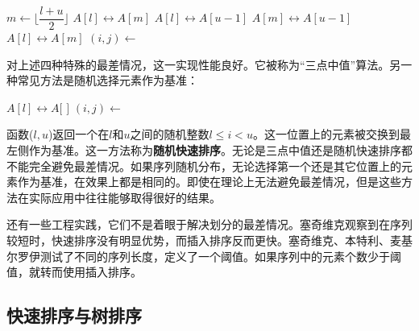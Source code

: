 \documentclass[b5paper]{ctexart}
\begin{document}
\begin{algorithmic}[1]
    \State $m \gets \lfloor \dfrac{l + u}{2} \rfloor$ 
     
      \State {} $A[l] \leftrightarrow A[m]$
    \EndIf
     
      \State {} $A[l] \leftrightarrow A[u-1]$
    \EndIf
     
      \State {} $A[m] \leftrightarrow A[u-1]$
    \EndIf
    \State {} $A[l] \leftrightarrow A[m]$
    \State $(i, j) \gets $ 
    \State {}
    \State {}
  \EndIf
\EndProcedure
\end{algorithmic}

对上述四种特殊的最差情况，这一实现性能良好。它被称为“三点中值”算法。另一种常见方法是随机选择元素作为基准：

\begin{algorithmic}[1]
    \State {} $A[l] \leftrightarrow A[$  $]$
    \State $(i, j) \gets $ 
    \State {}
    \State {}
  \EndIf
\EndProcedure
\end{algorithmic}

函数($l, u$)返回一个在$l$和$u$之间的随机整数$l \leq i < u$。这一位置上的元素被交换到最左侧作为基准。这一方法称为\textbf{随机快速排序}\cite{CLRS}。无论是三点中值还是随机快速排序都不能完全避免最差情况。如果序列随机分布，无论选择第一个还是其它位置上的元素作为基准，在效果上都是相同的。即使在理论上无法避免最差情况，但是这些方法在实际应用中往往能够取得很好的结果。

还有一些工程实践，它们不是着眼于解决划分的最差情况。塞奇维克观察到在序列较短时，快速排序没有明显优势，而插入排序反而更快\cite{Bentley}\cite{3-way-part}。塞奇维克、本特利、麦基尔罗伊测试了不同的序列长度，定义了一个阈值。如果序列中的元素个数少于阈值，就转而使用插入排序。

\begin{algorithmic}[1]
    \State {}
  \Else
    \State {}
  \EndIf
\EndProcedure
\end{algorithmic}

\subsection{快速排序与树排序}
\end{document}
